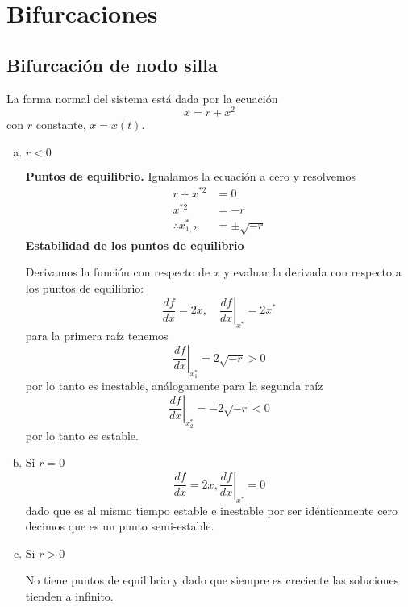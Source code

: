\chapter{Bifurcaciones}  
\section{Bifurcación de nodo silla}
La forma normal del sistema está dada por la ecuación
\begin{equation*}
  \dot{x} = r + x^2 
\end{equation*}
con $r$ constante, $x=x(t)$. 
\begin{enumerate}[a)]
	\item $r<0$

    \textbf{Puntos de equilibrio.} Igualamos la ecuación a cero y resolvemos
\begin{align*}
r+x^{* 2} &=0 \\
x^{* 2} &=-r \\
\therefore x_{1,2}^{*} &=\pm \sqrt{-r}
\end{align*}
\textbf{Estabilidad de los puntos de equilibrio}

Derivamos la función con respecto de $x$ y evaluar la derivada con respecto a los puntos de equilibrio:
\begin{equation*}
\frac{d f}{d x}=2 x,\left.\quad \frac{d f}{d x}\right|_{x^{*}}=2 x^{*}
\end{equation*}
para la primera raíz tenemos
$$
\left.\frac{d f}{d x}\right|_{x_{1}^{*}}=2 \sqrt{-r}>0
$$
por lo tanto es inestable, análogamente para la segunda raíz
$$
\left.\frac{d f}{d x}\right|_{x_{2}^{*}}=-2 \sqrt{-r}<0
$$
por lo tanto es estable.

\item Si $r=0$
  $$
  \frac{d f}{d x}=2 x,\left.\frac{d f}{d x}\right|_{x^{*}}=0
  $$
  dado que es al mismo tiempo estable e inestable por ser idénticamente cero decimos que es un punto semi-estable.

  \item Si $r>0$
    
    No tiene puntos de equilibrio y dado que siempre es creciente las soluciones tienden a infinito.
\end{enumerate}

\begin{figure}[H]
 \centering
\end{figure}

